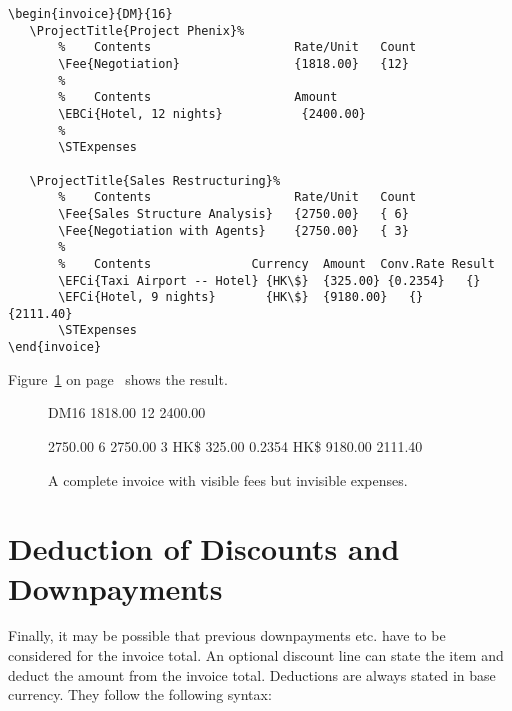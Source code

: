\documentclass[11pt]{ltxdoc}
\begin{document}
\begin{verbatim}
\begin{invoice}{DM}{16}
   \ProjectTitle{Project Phenix}%
       %    Contents                    Rate/Unit   Count
       \Fee{Negotiation}                {1818.00}   {12}
       %
       %    Contents                    Amount
       \EBCi{Hotel, 12 nights}           {2400.00}
       %
       \STExpenses

   \ProjectTitle{Sales Restructuring}%
       %    Contents                    Rate/Unit   Count
       \Fee{Sales Structure Analysis}   {2750.00}   { 6}
       \Fee{Negotiation with Agents}    {2750.00}   { 3}
       %
       %    Contents              Currency  Amount  Conv.Rate Result
       \EFCi{Taxi Airport -- Hotel} {HK\$}  {325.00} {0.2354}   {}
       \EFCi{Hotel, 9 nights}       {HK\$}  {9180.00}   {}    {2111.40}
       \STExpenses
\end{invoice}
\end{verbatim}

Figure~\ref{invoice_with_hidden_expenses} on
page~\pageref{invoice_with_hidden_expenses}
shows the result.

\begin{figure}[h]
\begin{invoice}{DM}{16}
       		{1818.00}	{12}
       		{2400.00}
       \STExpenses

          {2750.00}   { 6}
           {2750.00}   { 3}
        {HK\$}  {325.00} {0.2354}   {}
              {HK\$}  {9180.00}   {} {2111.40}
       \STExpenses
\end{invoice}
\caption{A complete invoice with visible fees
		but invisible expenses.\label{invoice_with_hidden_expenses}}
\end{figure}


\section{Deduction of Discounts and Downpayments}

Finally, it may be possible that previous downpayments etc. have to 
be considered for the invoice total. An optional discount line
can state the item and deduct the amount from the invoice total.
Deductions are always stated in base currency. They follow the following
syntax:
\end{document}
